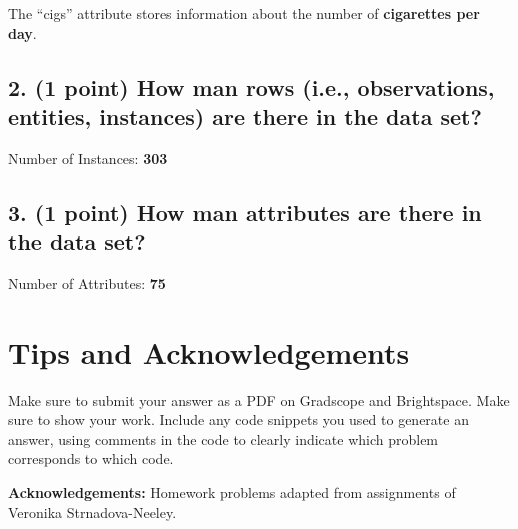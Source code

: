 \documentclass[11pt]{article}
\begin{document}
\begin{tcolorbox}[title=Problem 4.1]
    The ``cigs'' attribute stores information about the number of \textbf{cigarettes per day}.
\end{tcolorbox}

\subsection*{\textbf{2. (1 point)} How man rows (i.e., observations, entities, instances) are there in the data set?}

\begin{tcolorbox}[title=Problem 4.2]
    Number of Instances: \textbf{303} 
\end{tcolorbox}

\subsection*{\textbf{3. (1 point)} How man attributes are there in the data set?}

\begin{tcolorbox}[title=Problem 4.3]
    Number of Attributes: \textbf{75} 
\end{tcolorbox}

\newpage
\section*{Tips and Acknowledgements}

Make sure to submit your answer as a PDF on Gradscope and Brightspace. Make sure
to show your work. Include any code snippets you used to generate an answer,
using comments in the code to clearly indicate which problem corresponds to
which code.


{\bf Acknowledgements:} Homework problems adapted from assignments of
Veronika Strnadova-Neeley.
\end{document}
